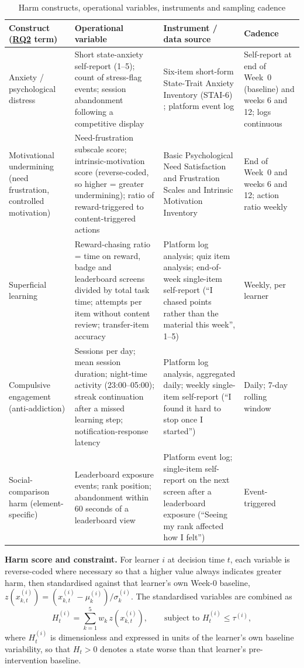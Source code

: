 \documentclass[12pt,a4paper]{article}
\DeclareRobustCommand{\rqlink}[1]{\texorpdfstring{\hyperref[rq:rq#1]{RQ#1}}{RQ#1}}
\begin{document}
\begin{justify}
\begin{table}[H]
\caption{Harm constructs, operational variables, instruments and sampling cadence}
\label{tab:harm-constructs}
\fontsize{10pt}{12pt}\selectfont
\begin{tabular}{|L{2.7cm}|L{4.2cm}|L{4.3cm}|L{2.7cm}|}
\hline
\centering\textbf{Construct (\rqlink{2} term)} & \centering\textbf{Operational variable} & \centering\textbf{Instrument / data source} & \centering\textbf{Cadence}
\tabularnewline
\hline
Anxiety / psychological distress & Short state-anxiety self-report (1--5); count of stress-flag events; session abandonment following a competitive display & Six-item short-form State-Trait Anxiety Inventory (STAI-6) \parencite{marteau1992stai}; platform event log & Self-report at end of Week~0 (baseline) and weeks 6 and 12; logs continuous
\tabularnewline
\hline
Motivational undermining (need frustration, controlled motivation) & Need-frustration subscale score; intrinsic-motivation score (reverse-coded, so higher = greater undermining); ratio of reward-triggered to content-triggered actions & Basic Psychological Need Satisfaction and Frustration Scales and Intrinsic Motivation Inventory \parencite{gao2024sdt} & End of Week~0 and weeks 6 and 12; action ratio weekly
\tabularnewline
\hline
Superficial learning & Reward-chasing ratio = time on reward, badge and leaderboard screens divided by total task time; attempts per item without content review; transfer-item accuracy & Platform log analysis; quiz item analysis; end-of-week single-item self-report (``I chased points rather than the material this week'', 1--5) & Weekly, per learner
\tabularnewline
\hline
Compulsive engagement (anti-addiction) & Sessions per day; mean session duration; night-time activity (23:00--05:00); streak continuation after a missed learning step; notification-response latency & Platform log analysis, aggregated daily; weekly single-item self-report (``I found it hard to stop once I started'') & Daily; 7-day rolling window
\tabularnewline
\hline
Social-comparison harm (element-specific) & Leaderboard exposure events; rank position; abandonment within 60 seconds of a leaderboard view & Platform event log; single-item self-report on the next screen after a leaderboard exposure (``Seeing my rank affected how I felt'') & Event-triggered
\tabularnewline
\hline
\end{tabular}
\end{table}

\textbf{Harm score and constraint.} For learner $i$ at decision time $t$, each variable is reverse-coded where necessary so that a higher value always indicates greater harm, then standardised against that learner's own Week-0 baseline, $z(x_{k,t}^{(i)}) = (x_{k,t}^{(i)} - \mu_k^{(i)}) / \sigma_k^{(i)}$. The standardised variables are combined as
\begin{equation}
H_t^{(i)} = \sum_{k=1}^{5} w_k \, z\!\left(x_{k,t}^{(i)}\right), \qquad \text{subject to } H_t^{(i)} \le \tau^{(i)},
\label{eq:harm}
\end{equation}
where $H_t^{(i)}$ is dimensionless and expressed in units of the learner's own baseline variability, so that $H_t > 0$ denotes a state worse than that learner's pre-intervention baseline.


\end{justify}
\end{document}
